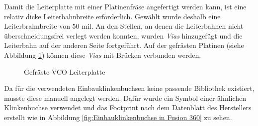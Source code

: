 Damit die Leiterplatte mit einer Platinenfräse angefertigt werden kann, ist eine relativ dicke Leiterbahnbreite erforderlich. 
Gewählt wurde deshalb eine Leiterbrahnbreite von 50 mil.
An den Stellen, an denen die Leiterbahnen nicht überschneidungsfrei verlegt werden konnten, wurden \textit{Vias} hinzugefügt und die Leiterbahn auf der anderen Seite fortgeführt.
Auf der gefrästen Platinen (siehe Abbildung \ref{fig:VCO Leiterplatte gefraest}) können diese \textit{Vias} mit Brücken verbunden werden.

\begin{figure}[h]
	\centering
	\setlength{\fboxsep}{1pt} %
	\setlength{\fboxrule}{1pt} %
	\caption{Gefräste VCO Leiterplatte}
	\label{fig:VCO Leiterplatte gefraest}
\end{figure}

Da für die verwendeten Einbauklinkenbuchsen keine passende Bibliothek existiert, musste diese manuell angelegt werden.
Dafür wurde ein Symbol einer ähnlichen Klinkenbuchse verwendet und das Footprint nach dem Datenblatt des Herstellers erstellt wie in Abbildung \ref{fig:Einbauklinkenbuchse in Fusion 360} zu sehen. \cite{cliff}

\begin{figure}[h]

\end{figure}

